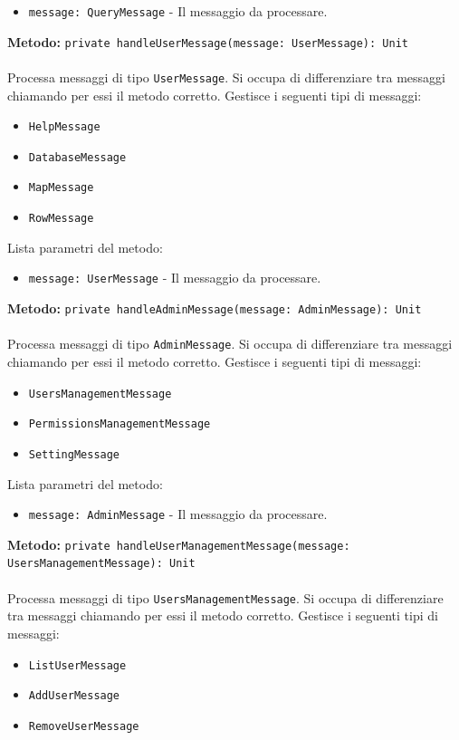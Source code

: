 \documentclass[a4paper]{article}
\begin{document}
			\begin{itemize}
				\item \texttt{message: QueryMessage} - Il messaggio da processare.
			\end{itemize}
		\textbf{Metodo: }\texttt{private handleUserMessage(message: UserMessage): Unit}
			\\ \\
			Processa messaggi di tipo \texttt{UserMessage}. Si occupa di differenziare tra messaggi chiamando per essi il metodo corretto.
			Gestisce i seguenti tipi di messaggi:
			\begin{itemize}
				\item \texttt{HelpMessage}
				\item \texttt{DatabaseMessage}
				\item \texttt{MapMessage}
				\item \texttt{RowMessage}
			\end{itemize}
			Lista parametri del metodo:
			\begin{itemize}
				\item \texttt{message: UserMessage} - Il messaggio da processare.
			\end{itemize}
		\textbf{Metodo: }\texttt{private handleAdminMessage(message: AdminMessage): Unit}
			\\ \\
			Processa messaggi di tipo \texttt{AdminMessage}. Si occupa di differenziare tra messaggi chiamando per essi il metodo corretto.
			Gestisce i seguenti tipi di messaggi:
			\begin{itemize}
				\item \texttt{UsersManagementMessage}
				\item \texttt{PermissionsManagementMessage}
				\item \texttt{SettingMessage}
			\end{itemize}
			Lista parametri del metodo:
			\begin{itemize}
				\item \texttt{message: AdminMessage} - Il messaggio da processare.
			\end{itemize}
		\textbf{Metodo: }\texttt{private handleUserManagementMessage(message: UsersManagementMessage): Unit}
			\\ \\
			Processa messaggi di tipo \texttt{UsersManagementMessage}. Si occupa di differenziare tra messaggi chiamando per essi il metodo corretto.
			Gestisce i seguenti tipi di messaggi:
			\begin{itemize}
				\item \texttt{ListUserMessage}
				\item \texttt{AddUserMessage}
				\item \texttt{RemoveUserMessage}
			\end{itemize}
\end{document}
